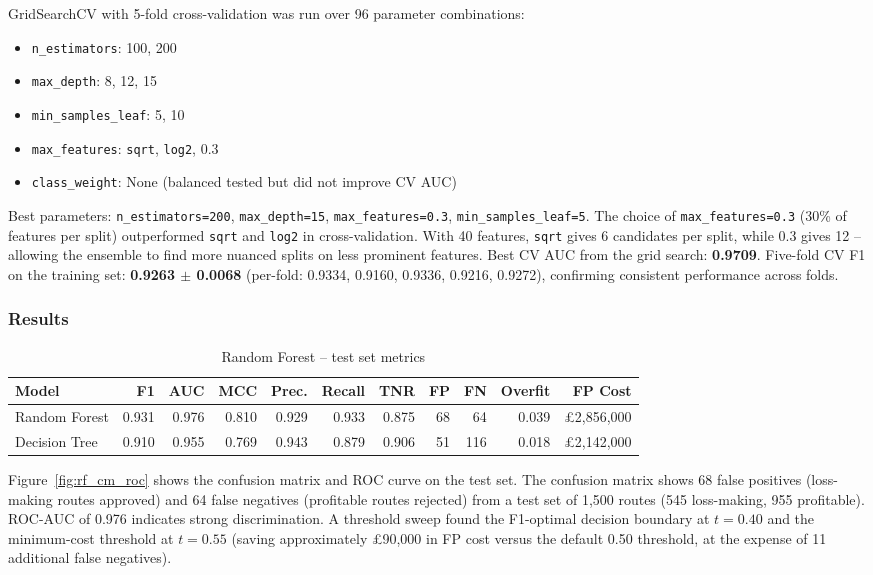\documentclass[12pt,a4paper]{article}
\begin{document}
GridSearchCV with 5-fold cross-validation was run over 96 parameter combinations:
\begin{itemize}[leftmargin=*, noitemsep]
  \item \texttt{n\_estimators}: 100, 200
  \item \texttt{max\_depth}: 8, 12, 15
  \item \texttt{min\_samples\_leaf}: 5, 10
  \item \texttt{max\_features}: \texttt{sqrt}, \texttt{log2}, 0.3
  \item \texttt{class\_weight}: None (balanced tested but did not improve CV AUC)
\end{itemize}

Best parameters: \texttt{n\_estimators=200}, \texttt{max\_depth=15}, \texttt{max\_features=0.3}, \texttt{min\_samples\_leaf=5}. The choice of \texttt{max\_features=0.3} (30\% of features per split) outperformed \texttt{sqrt} and \texttt{log2} in cross-validation. With 40 features, \texttt{sqrt} gives 6 candidates per split, while 0.3 gives 12 -- allowing the ensemble to find more nuanced splits on less prominent features. Best CV AUC from the grid search: \textbf{0.9709}. Five-fold CV F1 on the training set: \textbf{0.9263 $\pm$ 0.0068} (per-fold: 0.9334, 0.9160, 0.9336, 0.9216, 0.9272), confirming consistent performance across folds.

\subsubsection{Results}

\begin{table}[H]
  \centering
  \caption{Random Forest -- test set metrics}
  \label{tab:rf_results}
  \begin{tabular}{lrrrrrrrrrr}
    \toprule
    \textbf{Model} & \textbf{F1} & \textbf{AUC} & \textbf{MCC} & \textbf{Prec.} & \textbf{Recall} & \textbf{TNR} & \textbf{FP} & \textbf{FN} & \textbf{Overfit} & \textbf{FP Cost} \\
    \midrule
    Random Forest & 0.931 & 0.976 & 0.810 & 0.929 & 0.933 & 0.875 & 68 & 64 & 0.039 & £2,856,000 \\
    Decision Tree & 0.910 & 0.955 & 0.769 & 0.943 & 0.879 & 0.906 & 51 & 116 & 0.018 & £2,142,000 \\
    \bottomrule
  \end{tabular}
\end{table}

Figure~\ref{fig:rf_cm_roc} shows the confusion matrix and ROC curve on the test set. The confusion matrix shows 68 false positives (loss-making routes approved) and 64 false negatives (profitable routes rejected) from a test set of 1,500 routes (545 loss-making, 955 profitable). ROC-AUC of 0.976 indicates strong discrimination. A threshold sweep found the F1-optimal decision boundary at $t = 0.40$ and the minimum-cost threshold at $t = 0.55$ (saving approximately £90,000 in FP cost versus the default 0.50 threshold, at the expense of 11 additional false negatives).
\end{document}
